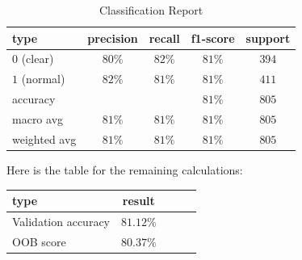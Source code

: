 \documentclass[12pt]{article}
\begin{document}
    \begin{table}[ht!]
        \centering
        \caption{Classification Report}
        \label{table:tache_lecture_report}
        \begin{tabular}{|l|c|c|c|c|}
            \hline
            \textbf{type} & \textbf{precision} & \textbf{recall} & \textbf{f1-score} & \textbf{support} \\
            \hline
            \hline
            $0$ (clear)   & $80\%$             & $82\%$          & $81\%$            & $394$            \\
            \hline
            $1$ (normal)  & $82\%$             & $81\%$          & $81\%$            & $411$            \\
            \hline
            accuracy      &                    &                 & $81\%$            & $805$            \\
            \hline
            macro avg     & $81\%$             & $81\%$          & $81\%$            & $805$            \\
            \hline
            weighted avg  & $81\%$             & $81\%$          & $81\%$            & $805$            \\
            \hline
        \end{tabular}
    \end{table}

    Here is the table for the remaining calculations:

    \begin{table}[ht!]
        \begin{tabular}{|l|c|c|c|c|}
            \hline
            \textbf{type}       & \textbf{result} \\
            \hline
            \hline
            Validation accuracy & $81.12\%$       \\
            \hline
            OOB score           & $80.37\%$       \\
            \hline
        \end{tabular}
    \end{table}
\end{document}
